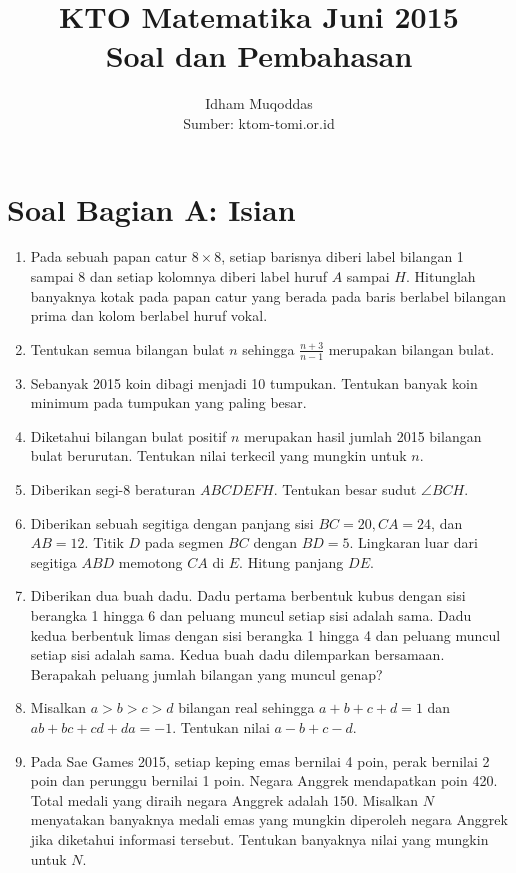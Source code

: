 \documentclass[11pt]{article}
\title{\textbf{KTO Matematika Juni 2015}\\Soal dan Pembahasan}
\author{Idham Muqoddas\\[1ex] \small{Sumber: ktom-tomi.or.id}}
\date{}
\begin{document}
\maketitle

\section*{Soal Bagian A: Isian}
\begin{enumerate}
    \item Pada sebuah papan catur $8 \times 8$, setiap barisnya diberi label bilangan 1 sampai 8 dan setiap kolomnya diberi label huruf $A$ sampai $H$. Hitunglah banyaknya kotak pada papan catur yang berada pada baris berlabel bilangan prima dan kolom berlabel huruf vokal.
    
    \item Tentukan semua bilangan bulat $n$ sehingga $\frac{n+3}{n-1}$ merupakan bilangan bulat.
    
    \item Sebanyak 2015 koin dibagi menjadi 10 tumpukan. Tentukan banyak koin minimum pada tumpukan yang paling besar.
    
    \item Diketahui bilangan bulat positif $n$ merupakan hasil jumlah 2015 bilangan bulat berurutan. Tentukan nilai terkecil yang mungkin untuk $n$.
    
    \item Diberikan segi-8 beraturan $ABCDEFH$. Tentukan besar sudut $\angle BCH$.
    
    \item Diberikan sebuah segitiga dengan panjang sisi $BC = 20, CA = 24$, dan $AB = 12$. Titik $D$ pada segmen $BC$ dengan $BD = 5$. Lingkaran luar dari segitiga $ABD$ memotong $CA$ di $E$. Hitung panjang $DE$.
    
    \item Diberikan dua buah dadu. Dadu pertama berbentuk kubus dengan sisi berangka 1 hingga 6 dan peluang muncul setiap sisi adalah sama. Dadu kedua berbentuk limas dengan sisi berangka 1 hingga 4 dan peluang muncul setiap sisi adalah sama. Kedua buah dadu dilemparkan bersamaan. Berapakah peluang jumlah bilangan yang muncul genap?
    
    \item Misalkan $a > b > c > d$ bilangan real sehingga $a + b + c + d = 1$ dan $ab + bc + cd + da = -1$. Tentukan nilai $a - b + c - d$.
    
    \item Pada Sae Games 2015, setiap keping emas bernilai 4 poin, perak bernilai 2 poin dan perunggu bernilai 1 poin. Negara Anggrek mendapatkan poin 420. Total medali yang diraih negara Anggrek adalah 150. Misalkan $N$ menyatakan banyaknya medali emas yang mungkin diperoleh negara Anggrek jika diketahui informasi tersebut. Tentukan banyaknya nilai yang mungkin untuk $N$.
    

\end{enumerate}
\end{document}

